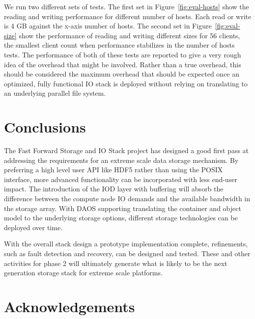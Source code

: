\documentclass[conference]{IEEEtran}
\begin{document}
We run two different sets of tests. The first set in
Figure~\ref{fig:eval-hosts} show the reading and writing performance for
different number of hosts. Each read or write is 4 GB against the x-axis number
of hosts. The second set in Figure~\ref{fig:eval-size} show the performance of
reading and writing different sizes for 56 clients, the smallest client count
when performance stabilizes in the number of hosts tests.  The performance of
both of these tests are reported to give a very rough idea of the overhead that
might be involved. Rather than a true overhead, this should be considered the
maximum overhead that should be expected once an optimized, fully functional IO
stack is deployed without relying on translating to an underlying parallel file
system. 

\section{Conclusions}
\label{sec:conclusion}

The Fast Forward Storage and IO Stack project has designed a good first pass at
addressing the requirements for an extreme scale data storage mechanism.  By
preferring a high level user API like HDF5 rather than using the POSIX
interface, more advanced functionality can be incorporated with less end-user
impact. The introduction of the IOD layer with buffering will absorb the
difference between the compute node IO demands and the available bandwidth in
the storage array. With DAOS supporting translating the container and object
model to the underlying storage options, different storage technologies can be
deployed over time.

With the overall stack design a prototype implementation complete, refinements,
such as fault detection and recovery, can be designed and tested.  These and
other activities for phase 2 will ultimately generate what is likely to be the
next generation storage stack for extreme scale platforms.

\section{Acknowledgements}
\end{document}
